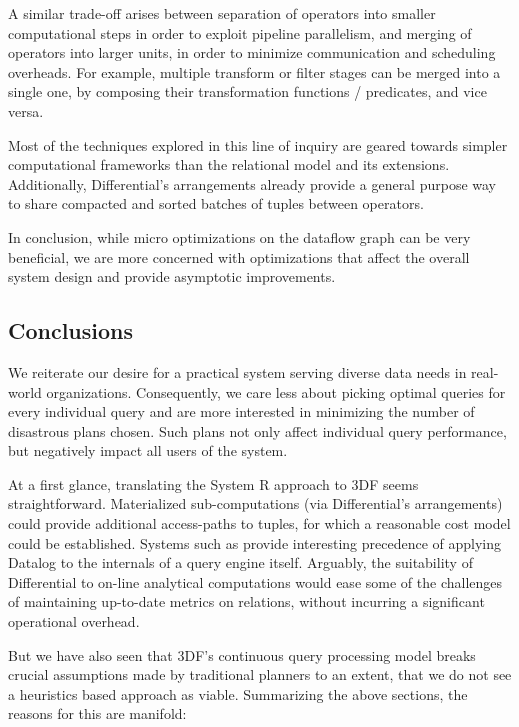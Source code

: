\documentclass[../index.tex]{subfiles}
\begin{document}
A similar trade-off arises between separation of operators into
smaller computational steps in order to exploit pipeline parallelism,
and merging of operators into larger units, in order to minimize
communication and scheduling overheads. For example, multiple
transform or filter stages can be merged into a single one, by
composing their transformation functions / predicates, and vice versa.

Most of the techniques explored in this line of inquiry are geared
towards simpler computational frameworks than the relational model and
its extensions. Additionally, Differential's arrangements already
provide a general purpose way to share compacted and sorted batches of
tuples between operators.

In conclusion, while micro optimizations on the dataflow graph can be
very beneficial, we are more concerned with optimizations that affect
the overall system design and provide asymptotic improvements.

\subsection{Conclusions}

We reiterate our desire for a practical system serving diverse data
needs in real-world organizations. Consequently, we care less about
picking optimal queries for every individual query and are more
interested in minimizing the number of disastrous plans chosen. Such
plans not only affect individual query performance, but negatively
impact all users of the system.

At a first glance, translating the System R approach to 3DF seems
straightforward. Materialized sub-computations (via Differential's
arrangements) could provide additional access-paths to tuples, for
which a reasonable cost model could be established. Systems such as
\cite{condie2008evita} provide interesting precedence of applying
Datalog to the internals of a query engine itself. Arguably, the
suitability of Differential to on-line analytical computations would
ease some of the challenges of maintaining up-to-date metrics on
relations, without incurring a significant operational overhead.

But we have also seen that 3DF's continuous query processing model
breaks crucial assumptions made by traditional planners to an extent,
that we do not see a heuristics based approach as viable. Summarizing
the above sections, the reasons for this are manifold:
\end{document}

